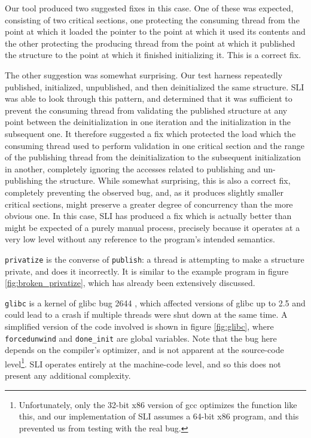 \documentclass[10pt,twocolumn,preprint,natbib,authoryear]{sigplanconf}
\begin{document}
Our tool produced two suggested fixes in this case.  One of these was
expected, consisting of two critical sections, one protecting the
consuming thread from the point at which it loaded the pointer to the
point at which it used its contents and the other protecting the
producing thread from the point at which it published the structure to
the point at which it finished initializing it.  This is a correct
fix.

The other suggestion was somewhat surprising.  Our test harness
repeatedly published, initialized, unpublished, and then deinitialized
the same structure.  SLI was able to look through this pattern, and
determined that it was sufficient to prevent the consuming thread from
validating the published structure at any point between the
deinitialization in one iteration and the initialization in the
subsequent one.  It therefore suggested a fix which protected the load
which the consuming thread used to perform validation in one critical
section and the range of the publishing thread from the
deinitialization to the subsequent initialization in another,
completely ignoring the accesses related to publishing and
un-publishing the structure.  While somewhat surprising, this is also
a correct fix, completely preventing the observed bug, and, as it
produces slightly smaller critical sections, might preserve a greater
degree of concurrency than the more obvious one.  In this case, SLI
has produced a fix which is actually better than might be expected of
a purely manual process, precisely because it operates at a very low
level without any reference to the program's intended semantics.

\verb|privatize| is the converse of \verb|publish|: a thread is
attempting to make a structure private, and does it incorrectly.  It
is similar to the example program in figure
\ref{fig:broken_privatize}, which has already been extensively
discussed.

\verb|glibc| is a kernel of glibc bug 2644 \cite{glibc2644}, which
affected versions of glibc up to 2.5 and could lead to a crash if
multiple threads were shut down at the same time.  A simplified
version of the code involved is shown in figure \ref{fig:glibc}, where
\verb|forcedunwind| and \verb|done_init| are global variables.  Note
that the bug here depends on the compiler's optimizer, and is not
apparent at the source-code level\footnote{Unfortunately, only the
  32-bit x86 version of gcc optimizes the function like this, and our
  implementation of SLI assumes a 64-bit x86 program, and this
  prevented us from testing with the real bug.}.  SLI operates
entirely at the machine-code level, and so this does not present any
additional complexity.
\end{document}
